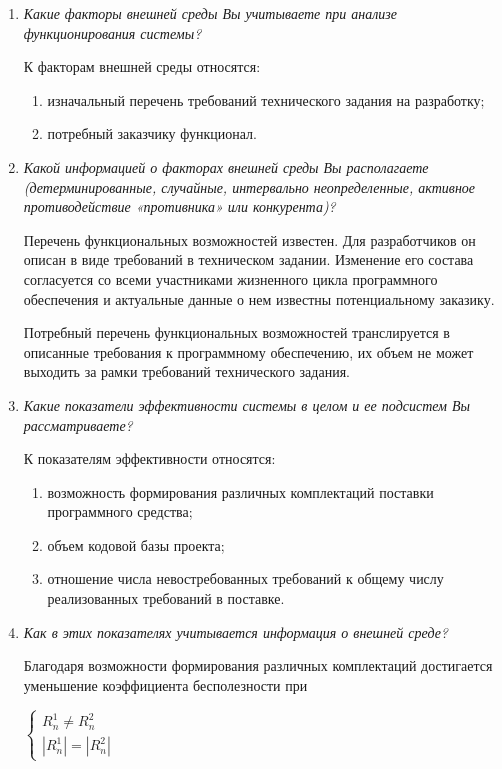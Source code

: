 \documentclass{article}
\begin{document}
\begin{enumerate}
        \item \textit{Какие факторы внешней среды Вы учитываете при анализе функционирования системы?}

        К факторам внешней среды относятся:
        \begin{enumerate}
            \item изначальный перечень требований технического задания на разработку;
            \item потребный заказчику функционал.
        \end{enumerate}

        \item \textit{Какой информацией о факторах внешней среды Вы располагаете (детерминированные, случайные, интервально неопределенные, активное противодействие «противника» или конкурента)?}

        Перечень функциональных возможностей известен. Для разработчиков он описан в виде требований в техническом задании. Изменение его состава согласуется со всеми участниками жизненного цикла программного обеспечения и актуальные данные о нем известны потенциальному заказику.

        Потребный перечень функциональных возможностей транслируется в описанные требования к программному обеспечению, их объем не может выходить за рамки требований технического задания.

        \item \textit{Какие показатели эффективности системы в целом и ее подсистем Вы рассматриваете?}

        К показателям эффективности относятся:
        \begin{enumerate}
            \item возможность формирования различных комплектаций поставки программного средства;
            \item объем кодовой базы проекта;
            \item отношение числа невостребованных требований к общему числу реализованных требований в поставке.
        \end{enumerate}

        \item \textit{Как в этих показателях учитывается информация о внешней среде?}

        Благодаря возможности формирования различных комплектаций достигается уменьшение коэффициента бесполезности при 

        \begin{center}
        $
            \begin{cases}
                R^1_{n} \not = R^2_{n}\\
                |R^1_{n}| = |R^2_{n}|
            \end{cases}
        $
        \end{center}


\end{enumerate}
\end{document}
